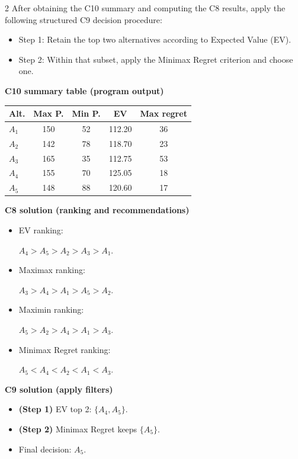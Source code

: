 \documentclass[12pt]{article}
\begin{document}
\begin{multicols}{2}
		After obtaining the C10 summary and computing the C8 results, apply the following structured C9 decision procedure:
		\begin{itemize}
			\item Step 1: Retain the top two alternatives according to Expected Value (EV).
			\item Step 2: Within that subset, apply the Minimax Regret criterion and choose one.
		\end{itemize}
		
		\textbf{C10 summary table (program output)}\par
		\begin{center}
			\begin{tabular}{l c c c c}
				\hline
				Alt. & Max P. & Min P. & EV & Max regret \\
				\hline
				$A_1$ & 150 & 52 & 112.20 & 36 \\
				$A_2$ & 142 & 78 & 118.70 & 23 \\
				$A_3$ & 165 & 35 & 112.75 & 53 \\
				$A_4$ & 155 & 70 & 125.05 & 18 \\
				$A_5$ & 148 & 88 & 120.60 & 17 \\
				\hline
			\end{tabular}
		\end{center}
		
		\textbf{C8 solution (ranking and recommendations)}\par
		\begin{itemize}
			\item EV ranking: \par $A_4>A_5>A_2>A_3>A_1$.
			\item Maximax ranking:\par $A_3>A_4>A_1>A_5>A_2$.
			\item Maximin ranking: \par$A_5>A_2>A_4>A_1>A_3$.
			\item Minimax Regret ranking:\par $A_5<A_4<A_2<A_1<A_3$.
		\end{itemize}
		
		\textbf{C9 solution (apply filters)}\par
		\begin{itemize}
			\item \textbf{(Step 1)} EV top 2: $\{A_4,A_5\}$.
			\item \textbf{(Step 2)} Minimax Regret keeps $\{A_5\}$.
			\item Final decision: $A_5$.
		\end{itemize}
		

\end{multicols}
\end{document}
